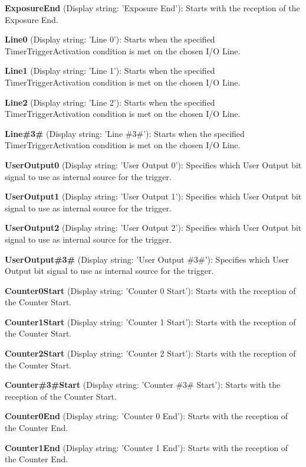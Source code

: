 \begin{DoxyItemize}
\item {\bfseries Exposure\+End} (Display string\+: 'Exposure End')\+: Starts with the reception of the Exposure End.
\item {\bfseries Line0} (Display string\+: 'Line 0')\+: Starts when the specified Timer\+Trigger\+Activation condition is met on the chosen I/\+O Line.
\item {\bfseries Line1} (Display string\+: 'Line 1')\+: Starts when the specified Timer\+Trigger\+Activation condition is met on the chosen I/\+O Line.
\item {\bfseries Line2} (Display string\+: 'Line 2')\+: Starts when the specified Timer\+Trigger\+Activation condition is met on the chosen I/\+O Line.
\item {\bfseries Line\#3\#} (Display string\+: 'Line \#3\#')\+: Starts when the specified Timer\+Trigger\+Activation condition is met on the chosen I/\+O Line.
\item {\bfseries User\+Output0} (Display string\+: 'User Output 0')\+: Specifies which User Output bit signal to use as internal source for the trigger.
\item {\bfseries User\+Output1} (Display string\+: 'User Output 1')\+: Specifies which User Output bit signal to use as internal source for the trigger.
\item {\bfseries User\+Output2} (Display string\+: 'User Output 2')\+: Specifies which User Output bit signal to use as internal source for the trigger.
\item {\bfseries User\+Output\#3\#} (Display string\+: 'User Output \#3\#')\+: Specifies which User Output bit signal to use as internal source for the trigger.
\item {\bfseries Counter0\+Start} (Display string\+: 'Counter 0 Start')\+: Starts with the reception of the Counter Start.
\item {\bfseries Counter1\+Start} (Display string\+: 'Counter 1 Start')\+: Starts with the reception of the Counter Start.
\item {\bfseries Counter2\+Start} (Display string\+: 'Counter 2 Start')\+: Starts with the reception of the Counter Start.
\item {\bfseries Counter\#3\#Start} (Display string\+: 'Counter \#3\# Start')\+: Starts with the reception of the Counter Start.
\item {\bfseries Counter0\+End} (Display string\+: 'Counter 0 End')\+: Starts with the reception of the Counter End.
\item {\bfseries Counter1\+End} (Display string\+: 'Counter 1 End')\+: Starts with the reception of the Counter End.

\end{DoxyItemize}
